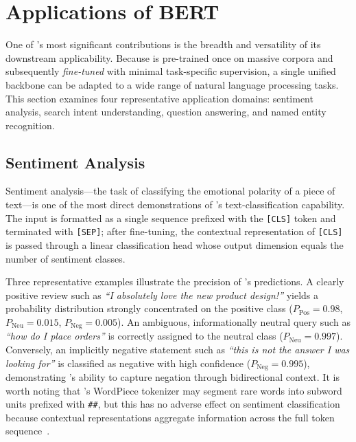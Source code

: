 

\section{Applications of BERT}
\label{sec:applications}

One of \bert{}'s most significant contributions is the breadth and versatility of its
downstream applicability.  Because \bert{} is pre-trained once on massive corpora and
subsequently \emph{fine-tuned} with minimal task-specific supervision, a single
unified backbone can be adapted to a wide range of natural language processing tasks.
This section examines four representative application domains: sentiment analysis,
search intent understanding, question answering, and named entity recognition.

\subsection{Sentiment Analysis}
\label{subsec:sentiment}

Sentiment analysis---the task of classifying the emotional polarity of a piece of
text---is one of the most direct demonstrations of \bert{}'s text-classification
capability.  The input is formatted as a single sequence prefixed with the
\texttt{[CLS]} token and terminated with \texttt{[SEP]}; after fine-tuning, the
contextual representation of \texttt{[CLS]} is passed through a linear classification
head whose output dimension equals the number of sentiment classes.

Three representative examples illustrate the precision of \bert{}'s predictions.
A clearly positive review such as \emph{``I absolutely love the new product design!''}
yields a probability distribution strongly concentrated on the positive class
($P_{\text{Pos}} = 0.98$, $P_{\text{Neu}} = 0.015$, $P_{\text{Neg}} = 0.005$).
An ambiguous, informationally neutral query such as \emph{``how do I place orders''}
is correctly assigned to the neutral class ($P_{\text{Neu}} = 0.997$).  Conversely, an
implicitly negative statement such as \emph{``this is not the answer I was looking
for''} is classified as negative with high confidence ($P_{\text{Neg}} = 0.995$),
demonstrating \bert{}'s ability to capture negation through bidirectional context.
It is worth noting that \bert{}'s WordPiece tokenizer may segment rare words into
subword units prefixed with \texttt{\#\#}, but this has no adverse effect on
sentiment classification because contextual representations aggregate information
across the full token sequence~\cite{devlin2019bert}.

